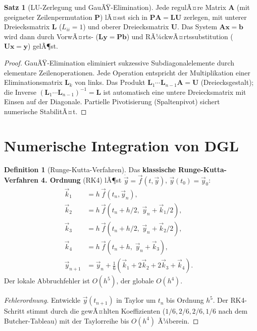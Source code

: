 ﻿\documentclass[a4paper,12pt]{report}
\theoremstyle{definition}
\newtheorem{definition}{Definition}
\newtheorem{satz}{Satz}
\begin{document}
\begin{satz}[LU-Zerlegung und GauÃŸ-Elimination]
Jede regulÃ¤re Matrix $\mathbf{A}$ (mit geeigneter Zeilenpermutation $\mathbf{P}$)
lÃ¤sst sich in $\mathbf{PA} = \mathbf{LU}$ zerlegen,
mit unterer Dreiecksmatrix $\mathbf{L}$ ($L_{ii} = 1$) und oberer
Dreiecksmatrix $\mathbf{U}$. Das System $\mathbf{Ax} = \mathbf{b}$ wird dann
durch VorwÃ¤rts- ($\mathbf{Ly} = \mathbf{Pb}$) und RÃ¼ckwÃ¤rtssubstitution
($\mathbf{Ux} = \mathbf{y}$) gelÃ¶st.
\end{satz}
\begin{proof}
GauÃŸ-Elimination eliminiert sukzessive Subdiagonalelemente durch
elementare Zeilenoperationen. Jede Operation entspricht der Multiplikation
einer Eliminationsmatrix $\mathbf{L}_k$ von links.
Das Produkt $\mathbf{L}_1\cdots\mathbf{L}_{n-1}\mathbf{A} = \mathbf{U}$
(Dreiecksgestalt); die Inverse $(\mathbf{L}_1\cdots\mathbf{L}_{n-1})^{-1} = \mathbf{L}$
ist automatisch eine untere Dreiecksmatrix mit Einsen auf der Diagonale.
Partielle Pivotisierung (Spaltenpivot) sichert numerische StabilitÃ¤t.
\end{proof}

\section{Numerische Integration von DGL}

\begin{definition}[Runge-Kutta-Verfahren]
Das \textbf{klassische Runge-Kutta-Verfahren 4. Ordnung} (RK4) lÃ¶st
$\dot{\vec{y}} = \vec{f}(t, \vec{y})$, $\vec{y}(t_0) = \vec{y}_0$:
\begin{align*}
  \vec{k}_1 &= h\,\vec{f}(t_n, \vec{y}_n), \\
  \vec{k}_2 &= h\,\vec{f}(t_n+h/2,\; \vec{y}_n+\vec{k}_1/2), \\
  \vec{k}_3 &= h\,\vec{f}(t_n+h/2,\; \vec{y}_n+\vec{k}_2/2), \\
  \vec{k}_4 &= h\,\vec{f}(t_n+h,\; \vec{y}_n+\vec{k}_3), \\
  \vec{y}_{n+1} &= \vec{y}_n + \frac{1}{6}(\vec{k}_1 + 2\vec{k}_2 + 2\vec{k}_3 + \vec{k}_4).
\end{align*}
Der lokale Abbruchfehler ist $O(h^5)$, der globale $O(h^4)$.
\end{definition}
\begin{proof}[Fehlerordnung]
Entwickle $\vec{y}(t_{n+1})$ in Taylor um $t_n$ bis Ordnung $h^5$.
Der RK4-Schritt stimmt durch die gewÃ¤hlten Koeffizienten ($1/6, 2/6, 2/6, 1/6$
nach dem Butcher-Tableau) mit der Taylorreihe bis $O(h^4)$ Ã¼berein.
\end{proof}
\end{document}
